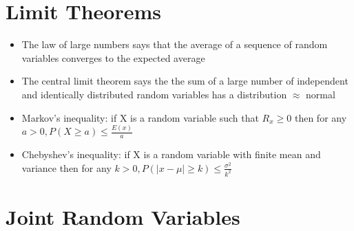 \documentclass[12pt]{article}
\begin{document}
\section{Limit Theorems}
\begin{itemize}
	\item The law of large numbers says that the average of a sequence of random variables converges to the expected average
	\item The central limit theorem says the the sum of a large number of independent and identically distributed random variables has a distribution $\approx$ normal 
	\item Markov's inequality: if X is a random variable such that $R_x \ge 0$ then for any $a>0, P(X\ge a) \le \frac{E(x)}{a}$
	\item Chebyshev's inequality: if X is a random variable with finite mean and variance then for any $k>0, P(|x-\mu |\ge k) \le \frac{\sigma^2}{k^2}$
\end{itemize}

\section{Joint Random Variables}
\end{document}
